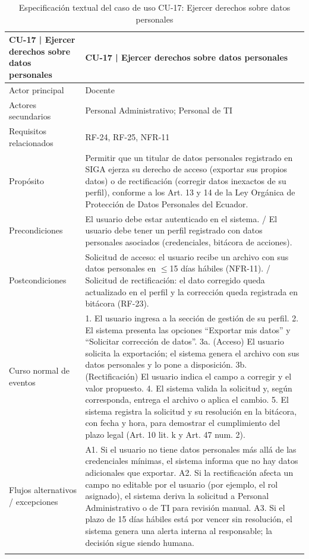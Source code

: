 \begingroup
\small
\begin{longtable}{|p{7.8cm}|p{7.8cm}|}
\hline
CU-17 | Ejercer derechos sobre datos personales & CU-17 | Ejercer derechos sobre datos personales \\ \hline
Actor principal & Docente \\ \hline
Actores secundarios & Personal Administrativo; Personal de TI \\ \hline
Requisitos relacionados & RF-24, RF-25, NFR-11 \\ \hline
Propósito & Permitir que un titular de datos personales registrado en SIGA ejerza su derecho de acceso (exportar sus propios datos) o de rectificación (corregir datos inexactos de su perfil), conforme a los Art. 13 y 14 de la Ley Orgánica de Protección de Datos Personales del Ecuador. \\ \hline
Precondiciones & El usuario debe estar autenticado en el sistema. / El usuario debe tener un perfil registrado con datos personales asociados (credenciales, bitácora de acciones). \\ \hline
Postcondiciones & Solicitud de acceso: el usuario recibe un archivo con sus datos personales en $\leq$15 días hábiles (NFR-11). / Solicitud de rectificación: el dato corregido queda actualizado en el perfil y la corrección queda registrada en bitácora (RF-23). \\ \hline
Curso normal de eventos & 1. El usuario ingresa a la sección de gestión de su perfil. 2. El sistema presenta las opciones ``Exportar mis datos'' y ``Solicitar corrección de datos''. 3a. (Acceso) El usuario solicita la exportación; el sistema genera el archivo con sus datos personales y lo pone a disposición. 3b. (Rectificación) El usuario indica el campo a corregir y el valor propuesto. 4. El sistema valida la solicitud y, según corresponda, entrega el archivo o aplica el cambio. 5. El sistema registra la solicitud y su resolución en la bitácora, con fecha y hora, para demostrar el cumplimiento del plazo legal (Art. 10 lit. k y Art. 47 num. 2). \\ \hline
Flujos alternativos / excepciones & A1. Si el usuario no tiene datos personales más allá de las credenciales mínimas, el sistema informa que no hay datos adicionales que exportar. A2. Si la rectificación afecta un campo no editable por el usuario (por ejemplo, el rol asignado), el sistema deriva la solicitud a Personal Administrativo o de TI para revisión manual. A3. Si el plazo de 15 días hábiles está por vencer sin resolución, el sistema genera una alerta interna al responsable; la decisión sigue siendo humana. \\ \hline
\caption{Especificación textual del caso de uso CU-17: Ejercer derechos sobre datos personales}
\end{longtable}
\endgroup

